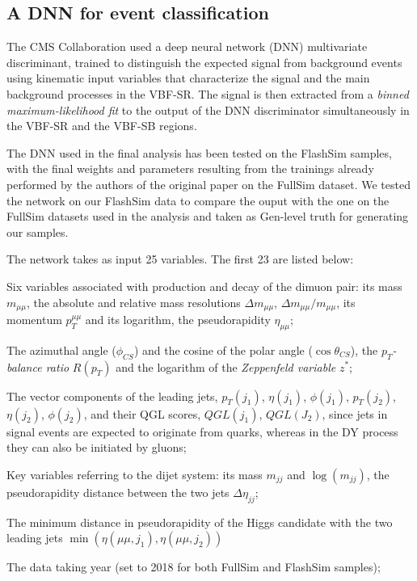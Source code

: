 \subsection{A DNN for event classification}
The CMS Collaboration used a deep neural network (DNN) multivariate discriminant, trained to distinguish the expected signal from background events using kinematic input variables that characterize the signal and the main background processes in the VBF-SR. The signal is then extracted from a \emph{binned maximum-likelihood fit} to the output of the DNN discriminator simultaneously in the VBF-SR and the VBF-SB regions. 

The DNN used in the final analysis has been tested on the FlashSim samples, with the final weights and parameters resulting from the trainings already performed by the authors of the original paper on the FullSim dataset. We tested the network on our FlashSim data to compare the ouput with the one on the FullSim datasets used in the analysis and taken as Gen-level truth for generating our samples.

The network takes as input 25 variables. The first 23 are listed below:

\begin{outline}
\1 Six variables associated with production and decay of the dimuon pair: its mass $m_{\mu\mu}$, the absolute and relative mass resolutions $\Delta m_{\mu\mu}$, $\Delta m_{\mu\mu}/m_{\mu\mu}$, its momentum $p_T^{\mu\mu}$ and its logarithm, the pseudorapidity $\eta_{\mu\mu}$;

\1 The azimuthal angle ($\phi_{CS}$) and the cosine of the polar angle ($\cos\theta_{CS}$), the $p_T$\emph{-balance ratio} $R(p_T)$ and the logarithm of the \emph{Zeppenfeld variable} $z^*$;

\1 The vector components of the leading jets, $p_T(j_1)$, $\eta(j_1)$, $\phi(j_1)$, $p_T(j_2)$, $\eta(j_2)$, $\phi(j_2)$, and their QGL scores, $QGL(j_1)$, $QGL(J_2)$, since jets in signal events are expected to originate from quarks, whereas in the DY process they can also be initiated by gluons;

\1 Key variables referring to the dijet system: its mass $m_{jj}$ and $\log(m_{jj})$, the pseudorapidity distance between the two jets $\Delta \eta_{jj}$;

\1  The minimum distance in pseudorapidity of the Higgs candidate with the two leading jets $\min(\eta(\mu\mu, j_1),\eta(\mu\mu, j_2))$

\1 The data taking year (set to 2018 for both FullSim and FlashSim samples);
\end{outline}


